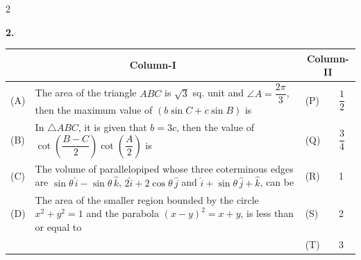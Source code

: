 \documentclass[10pt]{extarticle}
\newcommand{\qn}[1]{\par\smallskip\noindent\textbf{#1.}~}
\begin{document}
\begin{multicols}{2}
\qn{2} 
\begin{center}\footnotesize
\begin{tabular}{|p{0.5cm}|p{5.0cm}|p{0.6cm}|p{0.7cm}|}
\hline
\multicolumn{2}{|c|}{Column-I} & \multicolumn{2}{c|}{Column-II}\\ \hline
(A) & The area of the triangle $ABC$ is $\sqrt3$ sq. unit and $\angle A=\dfrac{2\pi}3$, then the maximum value of $(b\sin C+c\sin B)$ is & (P) & $\dfrac12$\\ \hline
(B) & In $\triangle ABC$, it is given that $b=3c$, then the value of $\cot\!\left(\dfrac{B-C}2\right)\cot\!\left(\dfrac A2\right)$ is & (Q) & $\dfrac34$\\ \hline
(C) & The volume of parallelopiped whose three coterminous edges are $\sin\theta\,\hat i-\sin\theta\,\hat k$, $2\hat i+2\cos\theta\,\hat j$ and $\hat i+\sin\theta\,\hat j+\hat k$, can be & (R) & 1\\ \hline
(D) & The area of the smaller region bounded by the circle $x^2+y^2=1$ and the parabola $(x-y)^2=x+y$, is less than or equal to & (S) & 2\\ \hline
 & & (T) & 3\\ \hline
\end{tabular}
\end{center}
\end{multicols}
\end{document}
